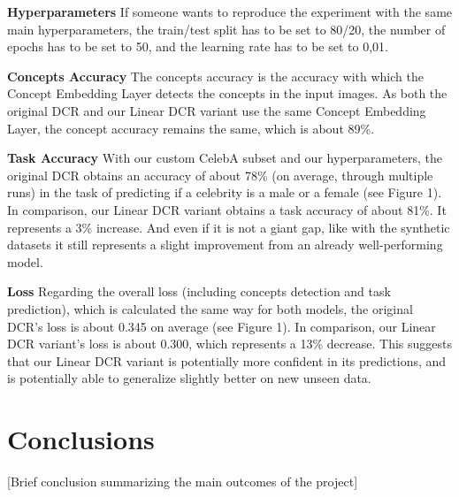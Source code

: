 \documentclass[sigconf, nonacm]{acmart}
\begin{document}
\textbf{Hyperparameters} If someone wants to reproduce the experiment with the same main hyperparameters, the train/test split has to be set to 80/20, the number of epochs has to be set to 50, and the learning rate has to be set to 0,01. \vspace{8pt}

\textbf{Concepts Accuracy} The concepts accuracy is the accuracy with which the Concept Embedding Layer detects the concepts in the input images. As both the original DCR and our Linear DCR variant use the same Concept Embedding Layer, the concept accuracy remains the same, which is about 89\%. \vspace{8pt}

\textbf{Task Accuracy} With our custom CelebA subset and our hyperparameters, the original DCR obtains an accuracy of about 78\% (on average, through multiple runs) in the task of predicting if a celebrity is a male or a female (see Figure 1). In comparison, our Linear DCR variant obtains a task accuracy of about 81\%. It represents a 3\% increase. And even if it is not a giant gap, like with the synthetic datasets it still represents a slight improvement from an already well-performing model. \vspace{8pt}

\textbf{Loss} Regarding the overall loss (including concepts detection and task prediction), which is calculated the same way for both models, the original DCR's loss is about 0.345 on average (see Figure 1). In comparison, our Linear DCR variant's loss is about 0.300, which represents a 13\% decrease. This suggests that our Linear DCR variant is potentially more confident in its predictions, and is potentially able to generalize slightly better on new unseen data.  \vspace{8pt}


\section{Conclusions}
\vspace{2pt}
[Brief conclusion summarizing the main outcomes of the project] \vspace{8pt}




\end{document}
